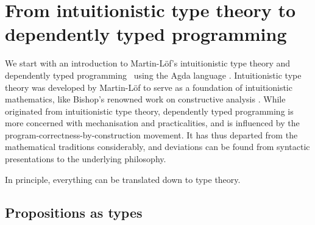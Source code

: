 \chapter{From intuitionistic type theory to dependently typed programming}
\label{chap:background}


We start with an introduction to Martin-Löf's intuitionistic type theory \citep{ML-TT73, ML-TT84, Nordstroem-programming} and dependently typed programming~\citep{Altenkirch-why-dependent-types-matter, McBride-Epigram} using the Agda language \citep{Norell-thesis, Norell-Agda, Bove-dependent-types-at-work}.
Intuitionistic type theory was developed by Martin-Löf to serve as a foundation of intuitionistic mathematics, like Bishop's renowned work on constructive analysis \citep{Bishop-analysis}.
While originated from intuitionistic type theory, dependently typed programming is more concerned with mechanisation and practicalities, and is influenced by the program-correctness-by-construction movement.
It has thus departed from the mathematical traditions considerably, and deviations can be found from syntactic presentations to the underlying philosophy.

In principle, everything can be translated down to type theory.

\section{Propositions as types}
\label{sec:type-theory}

